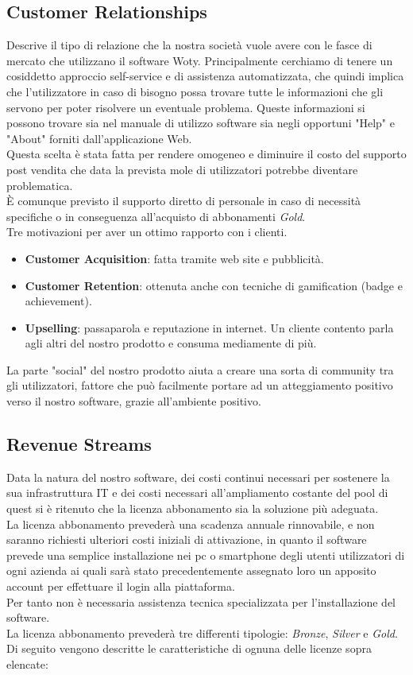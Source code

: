 \subsection{Customer Relationships}
Descrive il tipo di relazione che la nostra società vuole avere con le fasce di mercato che utilizzano il software Woty. Principalmente cerchiamo di tenere un cosiddetto approccio self-service e di assistenza automatizzata, che quindi implica che l'utilizzatore in caso di bisogno possa trovare tutte le informazioni che gli servono per poter risolvere un eventuale problema. Queste informazioni si possono trovare sia nel manuale di utilizzo software sia negli opportuni "Help" e "About" forniti dall'applicazione Web.\\
Questa scelta è stata fatta per rendere omogeneo e diminuire il costo del supporto post vendita che data la prevista mole di utilizzatori potrebbe diventare problematica.\\
È comunque previsto il supporto diretto di personale in caso di necessità specifiche o in conseguenza all'acquisto di abbonamenti \textit{Gold}. \\ Tre motivazioni per aver un ottimo rapporto con i clienti.
\begin{itemize}
\item \textbf{Customer Acquisition}: fatta tramite web site e pubblicità.
\item \textbf{Customer Retention}: ottenuta anche con tecniche di gamification (badge e achievement).
\item \textbf{Upselling}: passaparola e reputazione in internet. Un cliente contento parla agli altri del nostro prodotto e consuma mediamente di più.
\end{itemize}
La parte "social" del nostro prodotto aiuta a creare una sorta di community tra gli utilizzatori, fattore che può facilmente portare ad un atteggiamento positivo verso il nostro software, grazie all'ambiente positivo.

\subsection{Revenue Streams}
Data la natura del nostro software, dei costi continui necessari per sostenere la sua infrastruttura IT e dei costi necessari all'ampliamento costante del pool di quest si è ritenuto che la licenza abbonamento sia la soluzione più adeguata.\\
La licenza abbonamento prevederà una scadenza annuale rinnovabile, e non saranno richiesti ulteriori costi iniziali di attivazione, in quanto il software prevede una semplice installazione nei pc o smartphone degli utenti utilizzatori di ogni azienda ai quali sarà stato precedentemente assegnato loro un apposito account per effettuare il login alla piattaforma.\\
Per tanto non è necessaria assistenza tecnica specializzata per l'installazione del software.\\
La licenza abbonamento prevederà tre differenti tipologie: \textit{Bronze}, \textit{Silver} e \textit{Gold}.
Di seguito vengono descritte le caratteristiche di ognuna delle licenze sopra elencate:

